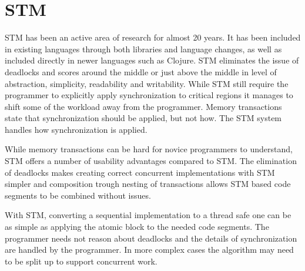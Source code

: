 
\section{\acl{STM}}\label{sec:choose_STM}
\ac{STM} has been an active area of research for almost 20 years\cite{shavit1997software}. It has been included in existing languages through both libraries\cite{rossbach2010transactional} and language changes\cite{harris2003language}, as well as included directly in newer languages such as Clojure. \ac{STM} eliminates the issue of deadlocks and scores around the middle or just above the middle in level of abstraction, simplicity, readability and writability. While \ac{STM} still require the programmer to explicitly apply synchronization to critical regions it manages to shift some of the workload away from the programmer. Memory transactions state that synchronization should be applied, but not how. The \ac{STM} system handles how synchronization is applied.

While memory transactions can be hard for novice programmers to understand, \ac{STM} offers a number of usability advantages compared to \ac{STM}. The elimination of deadlocks makes creating correct concurrent implementations with \ac{STM} simpler and composition trough nesting of transactions allows \ac{STM} based code segments to be combined without issues. 

With \ac{STM}, converting a sequential implementation to a thread safe one can be as simple as applying the atomic block to the needed code segments. The programmer needs not reason about deadlocks and the details of synchronization are handled by the programmer. In more complex cases the algorithm may need to be split up to support concurrent work. 

